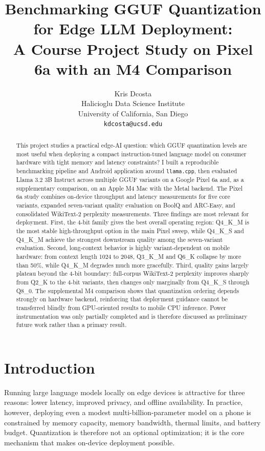\documentclass{article}
\title{Benchmarking GGUF Quantization for Edge LLM Deployment:\\
A Course Project Study on Pixel 6a with an M4 Comparison}
\author{%
  Kris Dcosta \\
  Halicioglu Data Science Institute \\
  University of California, San Diego \\
  \texttt{kdcosta@ucsd.edu} \\
}
\begin{document}
\maketitle

\begin{abstract}
This project studies a practical edge-AI question: which GGUF quantization levels are most useful when deploying a compact instruction-tuned language model on consumer hardware with tight memory and latency constraints? I built a reproducible benchmarking pipeline and Android application around \texttt{llama.cpp}, then evaluated Llama 3.2 3B Instruct across multiple GGUF variants on a Google Pixel 6a and, as a supplementary comparison, on an Apple M4 Mac with the Metal backend. The Pixel 6a study combines on-device throughput and latency measurements for five core variants, expanded seven-variant quality evaluation on BoolQ and ARC-Easy, and consolidated WikiText-2 perplexity measurements. Three findings are most relevant for deployment. First, the 4-bit family gives the best overall operating region: Q4\_K\_M is the most stable high-throughput option in the main Pixel sweep, while Q4\_K\_S and Q4\_K\_M achieve the strongest downstream quality among the seven-variant evaluation. Second, long-context behavior is highly variant-dependent on mobile hardware: from context length 1024 to 2048, Q3\_K\_M and Q6\_K collapse by more than 50\%, while Q4\_K\_M degrades much more gracefully. Third, quality gains largely plateau beyond the 4-bit boundary: full-corpus WikiText-2 perplexity improves sharply from Q2\_K to the 4-bit variants, then changes only marginally from Q4\_K\_S through Q8\_0. The supplemental M4 comparison shows that quantization ordering depends strongly on hardware backend, reinforcing that deployment guidance cannot be transferred blindly from GPU-oriented results to mobile CPU inference. Power instrumentation was only partially completed and is therefore discussed as preliminary future work rather than a primary result.
\end{abstract}

\section{Introduction}
\label{sec:intro}

Running large language models locally on edge devices is attractive for three reasons: lower latency, improved privacy, and offline availability. In practice, however, deploying even a modest multi-billion-parameter model on a phone is constrained by memory capacity, memory bandwidth, thermal limits, and battery budget. Quantization is therefore not an optional optimization; it is the core mechanism that makes on-device deployment possible.
\end{document}
